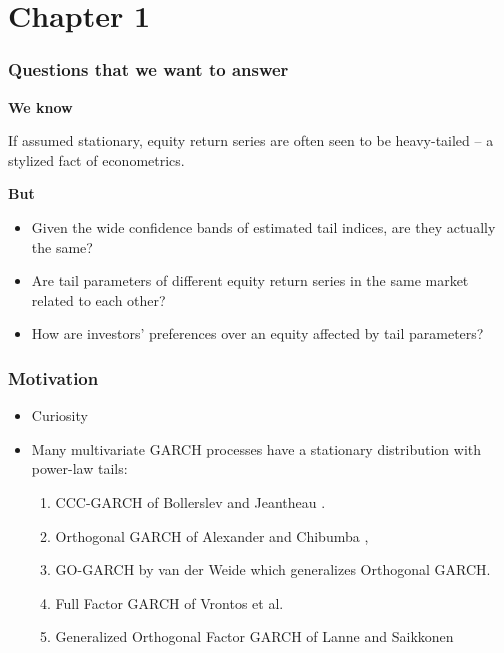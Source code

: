 \documentclass{beamer}
\begin{document}
\section{Chapter 1}
\begin{frame}
  \frametitle{Questions that we want to answer}
  \textcolor[HTML]{990033}{\bf We know}

  If assumed stationary, equity return series are often seen to be
  heavy-tailed -- a stylized fact of econometrics.
  
  \textcolor[HTML]{990033}{\bf But}
  \begin{itemize}
    \item Given the wide confidence bands of estimated tail indices,
      are they actually the same?
    \item Are tail parameters of different equity return series in the same
      market related to each other?
    \item How are investors' preferences over an equity affected by
      tail parameters?
  \end{itemize}
\end{frame}

\begin{frame}
  \frametitle{Motivation}
  \begin{itemize}
  \item Curiosity
    \item Many multivariate GARCH processes have a stationary
      distribution with power-law tails:
      \begin{enumerate}
        \item CCC-GARCH of Bollerslev \cite{bollerslev:1990} and
          Jeantheau \cite{jeantheau:1998}.
        \item Orthogonal GARCH of
          Alexander and Chibumba \cite{alexander:chibumba:1996},
        \item GO-GARCH by van der Weide \cite{Weide2002} which
          generalizes Orthogonal GARCH.
        \item Full Factor GARCH of Vrontos et
          al. \cite{vrontos2003full}
        \item Generalized Orthogonal Factor GARCH of Lanne and
          Saikkonen  \cite{lanne2007modelling}
      \end{enumerate}
  \end{itemize}
\end{frame}
\end{document}
